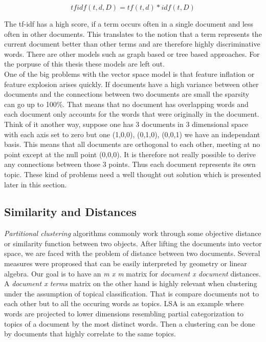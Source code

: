     \begin{equation}
      tfidf(t, d, D) = tf(t, d) * idf(t, D)
    \end{equation}

    The tf-idf has a high score, if a term occurs often in a single document and less often in other documents. This translates to the notion that a term represents the current document better than other terms and are therefore highly discriminative words. There are other models such as graph based or tree based approaches. For the porpuse of this thesis these models are left out. \cite[chp. 6]{IRBook2008}\\

    One of the big problems with the vector space model is that feature inflation or feature explosion arises quickly. If documents have a high variance between other documents and the connections between two documents are small the sparsity can go up to 100\%. That means that no document has overlapping words and each document only accounts for the words that were originally in the document. Think of it another way, suppose one has 3 documents in 3 dimensional space with each axis set to zero but one (1,0,0), (0,1,0), (0,0,1) we have an independant basis. This means that all documents are orthogonal to each other, meeting at no point except at the null point (0,0,0). It is therefore not really possible to derive any connections between those 3 points. Thus each document represents its own topic.
    These kind of problems need a well thought out solution which is presented later in this section.

  \subsection{Similarity and Distances}
    \emph{Partitional clustering} algorithms commonly work through some objective distance or similarity function between two objects. After lifting the documents into vector space, we are faced with the problem of distance between two documents. Several measures were proprosed that can be easily interpreted by geometry or linear algebra. Our goal is to have an \emph{m x m} matrix for \emph{document x document} distances. A \emph{document x terms} matrix on the other hand is highly relevant when clustering under the assumption of topical classification. That is compare documents not to each other but to all the occuring words as topics. LSA is an example where words are projected to lower dimensions resembling partial categorization to topics of a document by the most distinct words. Then a clustering can be done by documents that highly correlate to the same topics.

